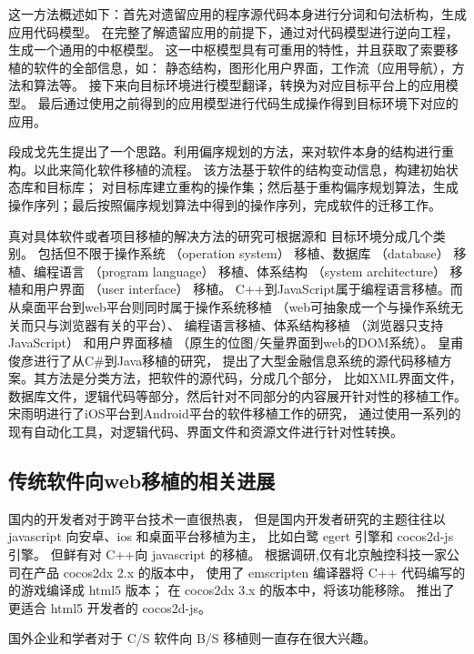 这一方法概述如下：首先对遗留应用的程序源代码本身进行分词和句法析构，生成应用代码模型。
在完整了解遗留应用的前提下，通过对代码模型进行逆向工程，生成一个通用的中枢模型。
这一中枢模型具有可重用的特性，并且获取了索要移植的软件的全部信息，如：
静态结构，图形化用户界面，工作流（应用导航），方法和算法等。
接下来向目标环境进行模型翻译，转换为对应目标平台上的应用模型。
最后通过使用之前得到的应用模型进行代码生成操作得到目标环境下对应的应用。

段成戈先生提出了一个思路。利用偏序规划的方法，来对软件本身的结构进行重构。以此来简化软件移植的流程。
该方法基于软件的结构变动信息，构建初始状态库和目标库；
对目标库建立重构的操作集；然后基于重构偏序规划算法，生成操作序列；最后按照偏序规划算法中得到的操作序列，完成软件的迁移工作。

真对具体软件或者项目移植的解决方法的研究可根据源和
目标环境分成几个类别。
包括但不限于操作系统 （operation system） 移植、数据库 （database） 移植、编程语言 （program language） 移植、体系结构 （system architecture） 移植和用户界面 （user interface） 移植。
C++到JavaScript属于编程语言移植。而从桌面平台到web平台则同时属于操作系统移植 （web可抽象成一个与操作系统无关而只与浏览器有关的平台）、
编程语言移植、体系结构移植 （浏览器只支持JavaScript） 和用户界面移植 （原生的位图/矢量界面到web的DOM系统）。
皇甫俊彦进行了从C\#到Java移植的研究，
提出了大型金融信息系统的源代码移植方案。其方法是分类方法，把软件的源代码，分成几个部分，
比如XML界面文件，
数据库文件，逻辑代码等部分，然后针对不同部分的内容展开针对性的移植工作。
宋雨明进行了iOS平台到Android平台的软件移植工作的研究，
通过使用一系列的现有自动化工具，对逻辑代码、界面文件和资源文件进行针对性转换。

\subsection{传统软件向web移植的相关进展}

国内的开发者对于跨平台技术一直很热衷，
但是国内开发者研究的主题往往以 javascript 向安卓、ios 和桌面平台移植为主，
比如白鹭 egert 引擎和 cocos2d-js 引擎。
但鲜有对 C++向 javascript 的移植。
根据调研,仅有北京触控科技一家公司在产品 cocos2dx 2.x 的版本中，
使用了 emscripten 编译器将 C++ 代码编写的的游戏编译成 html5 版本；
在 cocos2dx 3.x 的版本中，将该功能移除。
推出了更适合 html5 开发者的 cocos2d-js。

国外企业和学者对于 C/S 软件向 B/S 移植则一直存在很大兴趣。

